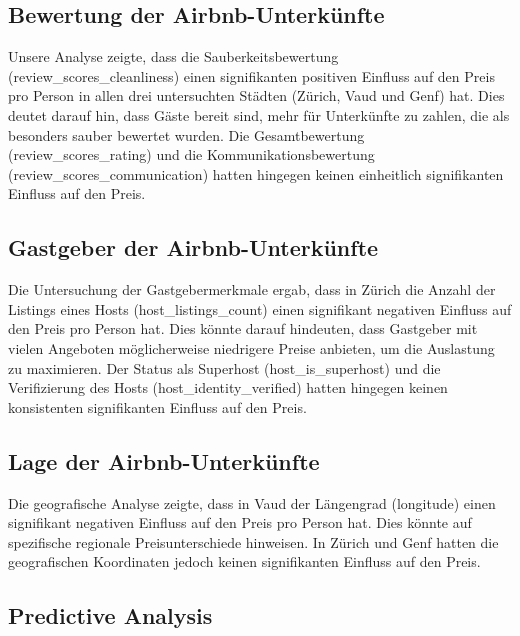 \documentclass[
  journal,
]{IEEEtran}%
\begin{document}
\hypertarget{bewertung-der-airbnb-unterkuxfcnfte-1}{%
\subsection{Bewertung der
Airbnb-Unterkünfte}\label{bewertung-der-airbnb-unterkuxfcnfte-1}}

Unsere Analyse zeigte, dass die Sauberkeitsbewertung
(review\_scores\_cleanliness) einen signifikanten positiven Einfluss auf
den Preis pro Person in allen drei untersuchten Städten (Zürich, Vaud
und Genf) hat. Dies deutet darauf hin, dass Gäste bereit sind, mehr für
Unterkünfte zu zahlen, die als besonders sauber bewertet wurden. Die
Gesamtbewertung (review\_scores\_rating) und die Kommunikationsbewertung
(review\_scores\_communication) hatten hingegen keinen einheitlich
signifikanten Einfluss auf den Preis.

\hypertarget{gastgeber-der-airbnb-unterkuxfcnfte}{%
\subsection{Gastgeber der
Airbnb-Unterkünfte}\label{gastgeber-der-airbnb-unterkuxfcnfte}}

Die Untersuchung der Gastgebermerkmale ergab, dass in Zürich die Anzahl
der Listings eines Hosts (host\_listings\_count) einen signifikant
negativen Einfluss auf den Preis pro Person hat. Dies könnte darauf
hindeuten, dass Gastgeber mit vielen Angeboten möglicherweise niedrigere
Preise anbieten, um die Auslastung zu maximieren. Der Status als
Superhost (host\_is\_superhost) und die Verifizierung des Hosts
(host\_identity\_verified) hatten hingegen keinen konsistenten
signifikanten Einfluss auf den Preis.

\hypertarget{lage-der-airbnb-unterkuxfcnfte}{%
\subsection{Lage der
Airbnb-Unterkünfte}\label{lage-der-airbnb-unterkuxfcnfte}}

Die geografische Analyse zeigte, dass in Vaud der Längengrad (longitude)
einen signifikant negativen Einfluss auf den Preis pro Person hat. Dies
könnte auf spezifische regionale Preisunterschiede hinweisen. In Zürich
und Genf hatten die geografischen Koordinaten jedoch keinen
signifikanten Einfluss auf den Preis.

\hypertarget{predictive-analysis-2}{%
\subsection{Predictive Analysis}\label{predictive-analysis-2}}
\end{document}
